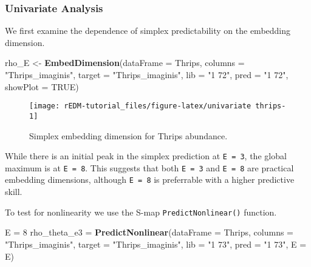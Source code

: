 \documentclass[]{article}
\newenvironment{Shaded}{\begin{snugshade}}{\end{snugshade}}
\newcommand{\DataTypeTok}[1]{\textcolor[rgb]{0.13,0.29,0.53}{#1}}
\newcommand{\DecValTok}[1]{\textcolor[rgb]{0.00,0.00,0.81}{#1}}
\newcommand{\KeywordTok}[1]{\textcolor[rgb]{0.13,0.29,0.53}{\textbf{#1}}}
\newcommand{\NormalTok}[1]{#1}
\newcommand{\OtherTok}[1]{\textcolor[rgb]{0.56,0.35,0.01}{#1}}
\newcommand{\StringTok}[1]{\textcolor[rgb]{0.31,0.60,0.02}{#1}}
\begin{document}
\hypertarget{univariate-analysis}{%
\subsubsection{Univariate Analysis}\label{univariate-analysis}}

We first examine the dependence of simplex predictability on the
embedding dimension.

\begin{Shaded}
\begin{Highlighting}[]
\NormalTok{rho_E <-}\StringTok{ }\KeywordTok{EmbedDimension}\NormalTok{(}\DataTypeTok{dataFrame =}\NormalTok{ Thrips, }\DataTypeTok{columns =} \StringTok{"Thrips_imaginis"}\NormalTok{, }\DataTypeTok{target =} \StringTok{"Thrips_imaginis"}\NormalTok{, }
    \DataTypeTok{lib =} \StringTok{"1 72"}\NormalTok{, }\DataTypeTok{pred =} \StringTok{"1 72"}\NormalTok{, }\DataTypeTok{showPlot =} \OtherTok{TRUE}\NormalTok{)}
\end{Highlighting}
\end{Shaded}

\begin{figure}[h]

{\centering \texttt{[image: rEDM-tutorial\_files/figure-latex/univariate thrips-1]} 

}

\caption{Simplex embedding dimension for Thrips abundance.}\label{fig:univariate thrips}
\end{figure}

While there is an initial peak in the simplex prediction at
\texttt{E\ =\ 3}, the global maximum is at \texttt{E\ =\ 8}. This
suggests that both \texttt{E\ =\ 3} and \texttt{E\ =\ 8} are practical
embedding dimensions, although \texttt{E\ =\ 8} is preferrable with a
higher predictive skill.

To test for nonlinearity we use the S-map \texttt{PredictNonlinear()}
function.

\begin{Shaded}
\begin{Highlighting}[]
\NormalTok{E =}\StringTok{ }\DecValTok{8}
\NormalTok{rho_theta_e3 =}\StringTok{ }\KeywordTok{PredictNonlinear}\NormalTok{(}\DataTypeTok{dataFrame =}\NormalTok{ Thrips, }\DataTypeTok{columns =} \StringTok{"Thrips_imaginis"}\NormalTok{, }
    \DataTypeTok{target =} \StringTok{"Thrips_imaginis"}\NormalTok{, }\DataTypeTok{lib =} \StringTok{"1 73"}\NormalTok{, }\DataTypeTok{pred =} \StringTok{"1 73"}\NormalTok{, }\DataTypeTok{E =}\NormalTok{ E)}
\end{Highlighting}
\end{Shaded}
\end{document}
